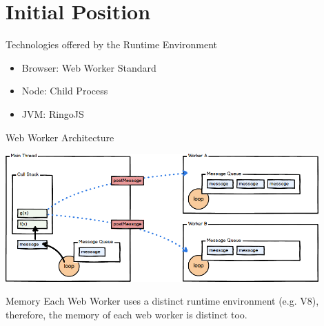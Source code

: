 \section{Initial Position}

\begin{frame}{Technologies offered by the Runtime Environment}
	\begin{itemize}
		\item Browser: Web Worker Standard~\cite{w3cWebWorker}
		\item Node: Child Process~\cite{childProcess}
		\item JVM: RingoJS~\cite{RingoJS}
	\end{itemize}
\end{frame}

\begin{frame}{Web Worker Architecture}
	\begin{center}
		\includegraphics[width=0.9\textwidth]{web-workers}~\cite{Swenson-Healey2013}
	\end{center}
	
	\begin{alertblock}{Memory}
		Each Web Worker uses a distinct runtime environment (e.g. V8), therefore, the memory of each web worker is distinct too.
	\end{alertblock}

\end{frame}


